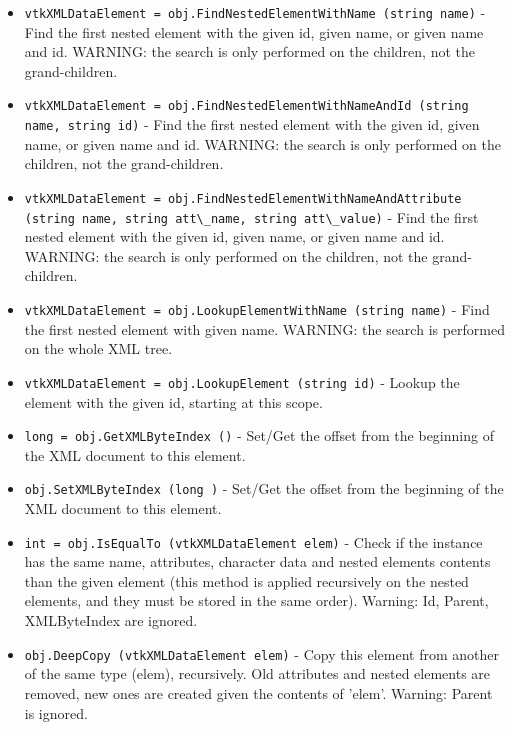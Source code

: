 \begin{itemize}
\item  \verb|vtkXMLDataElement = obj.FindNestedElementWithName (string name)| -  Find the first nested element with the given id, given name, or given
 name and id.
 WARNING: the search is only performed on the children, not 
 the grand-children.

\item  \verb|vtkXMLDataElement = obj.FindNestedElementWithNameAndId (string name, string id)| -  Find the first nested element with the given id, given name, or given
 name and id.
 WARNING: the search is only performed on the children, not 
 the grand-children.

\item  \verb|vtkXMLDataElement = obj.FindNestedElementWithNameAndAttribute (string name, string att\_name, string att\_value)| -  Find the first nested element with the given id, given name, or given
 name and id.
 WARNING: the search is only performed on the children, not 
 the grand-children.

\item  \verb|vtkXMLDataElement = obj.LookupElementWithName (string name)| -  Find the first nested element with given name.
 WARNING: the search is performed on the whole XML tree.

\item  \verb|vtkXMLDataElement = obj.LookupElement (string id)| -  Lookup the element with the given id, starting at this scope.

\item  \verb|long = obj.GetXMLByteIndex ()| -  Set/Get the offset from the beginning of the XML document to this element.

\item  \verb|obj.SetXMLByteIndex (long )| -  Set/Get the offset from the beginning of the XML document to this element.

\item  \verb|int = obj.IsEqualTo (vtkXMLDataElement elem)| -  Check if the instance has the same name, attributes, character data
 and nested elements contents than the given element (this method is
 applied recursively on the nested elements, and they must be stored in
 the same order).
 Warning: Id, Parent, XMLByteIndex are ignored.

\item  \verb|obj.DeepCopy (vtkXMLDataElement elem)| -  Copy this element from another of the same type (elem), recursively.
 Old attributes and nested elements are removed, new ones are created
 given the contents of 'elem'.
 Warning: Parent is ignored.


\end{itemize}
